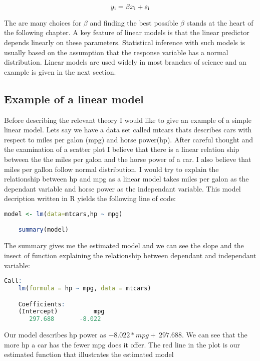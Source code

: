 \documentclass{article}
\begin{document}
    \begin{equation}  \label{linModel} y\textsubscript{i} = \beta x\textsubscript{i} + \varepsilon\textsubscript{i} \end{equation}

    The are many choices for $\beta$ and finding the best possible $\beta$ stands at the heart of the following chapter. A key feature of linear models is that the linear predictor depends linearly on these parameters. Statistical inference with such models is usually based on the assumption that the response variable has a normal distribution. Linear models are used widely in most branches of science and an example is given in the next section.

    \subsection{Example of a linear model}
    Before describing the relevant theory I would like to give an example of a simple linear model. Lets say we have a data set called mtcars thats describes cars with respect to miles per galon (mpg) and horse power(hp). After careful thought and the examination of a scatter plot I believe that there is a linear relation ship between the the miles per galon and the horse power of a car. I also believe that miles per gallon follow normal distribution. I would try to explain the relationship between hp and mpg as a linear model takes miles per galon as the dependant variable and horse power as the independant variable. This model decription written in R yields the following line of code:

    \begin{lstlisting}[language=R]
    model <- lm(data=mtcars,hp ~ mpg)

    summary(model)
    \end{lstlisting}

    The summary gives me the estimated model and we can see the slope and the insect of function explaining the relationship between dependant and independant variable:
    \begin{lstlisting}[language=R]
    Call:
    lm(formula = hp ~ mpg, data = mtcars)

    Coefficients:
    (Intercept)          mpg
       297.688       -8.022
    \end{lstlisting}

    Our model describes hp power as $-8.022*mpg +\ 297.688$. We can see that the more hp a car has the fewer mpg does it offer. The red line in the plot is our estimated function that illustrates the estimated model
\end{document}

